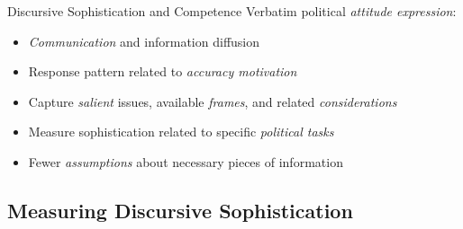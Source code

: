 \begin{frame}{Discursive Sophistication and Competence}
Verbatim political \emph{attitude expression}:
\begin{itemize}[<+->]
\item \emph{Communication} and information diffusion
\item Response pattern related to \emph{accuracy motivation}
\item Capture \emph{salient} issues, available \emph{frames}, and related \emph{considerations}
\item Measure sophistication related to specific \emph{political tasks}
\item Fewer \emph{assumptions} about necessary pieces of information
\end{itemize}\vspace{2em}
\end{frame}



\subsection{Measuring Discursive Sophistication}

